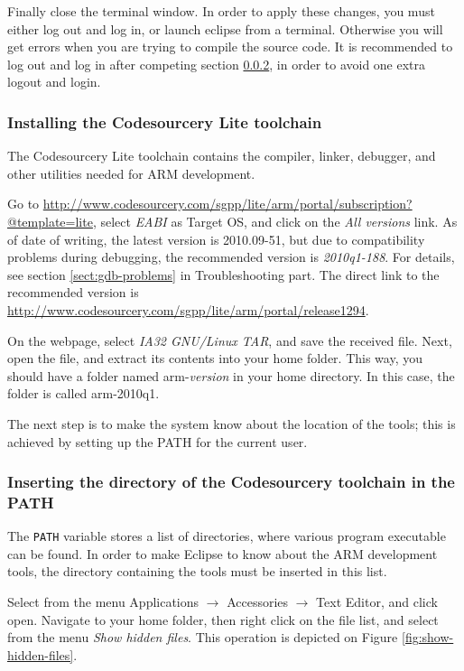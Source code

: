 \documentclass[a4paper, 10pt]{article}
\begin{document}
Finally close the terminal window.
In order to apply these changes, you must either log out and log in,
or launch eclipse from a terminal.
Otherwise you will get errors when you are trying to compile the source code.
It is recommended to log out and log in after
competing section \ref{sect:change-path}, in order to avoid one extra logout and login.

\subsubsection{Installing the Codesourcery Lite toolchain}

The Codesourcery Lite toolchain contains
the compiler, linker, debugger, and other utilities needed for
ARM development.

Go to
\url{http://www.codesourcery.com/sgpp/lite/arm/portal/subscription?@template=lite},
select \emph{EABI} as Target OS, and click on the
\emph{All versions} link.
As of date of writing, the latest version is 2010.09-51, but
due to compatibility problems during debugging, the recommended version is \emph{2010q1-188}.
For details, see section \ref{sect:gdb-problems} in Troubleshooting part.
The direct link to the recommended version is
\url{http://www.codesourcery.com/sgpp/lite/arm/portal/release1294}.

On the webpage, select \emph{IA32 GNU/Linux TAR},
and save the received file.
Next, open the file, and extract its contents into your home folder.
This way, you should have a folder named arm-\textit{version} in your home directory.
In this case, the folder is called arm-2010q1.

The next step is to make the system know about the location of the tools;
this is achieved by setting up the PATH for the current user.

\subsubsection{Inserting the directory of the Codesourcery toolchain in the PATH}

    \label{sect:change-path}
The \verb+PATH+ variable stores a list of directories, where various
program executable can be found. In order to make Eclipse to know about the
ARM development tools, the directory containing the tools must be inserted
in this list.

Select from the menu Applications $\rightarrow$ Accessories $\rightarrow$ Text Editor,
and click open. Navigate to your home folder, then right click on the file list,
and select from the menu \emph{Show hidden files}. This operation is depicted on Figure
\ref{fig:show-hidden-files}.
\end{document}

